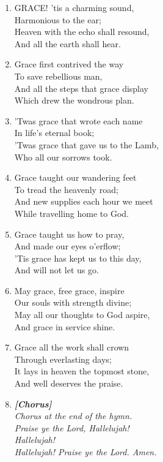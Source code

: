 \documentclass[11pt,a4paper]{article}
\begin{document}
\begin{enumerate}
    \item GRACE! 'tis a charming sound, \\
        Harmonious to the ear; \\
        Heaven with the echo shall resound, \\
        And all the earth shall hear.

    \item Grace first contrived the way \\
        To save rebellious man, \\
        And all the steps that grace display \\
        Which drew the wondrous plan.

    \item 'Twas grace that wrote each name \\
        In life's eternal book; \\
        'Twas grace that gave us to the Lamb, \\
        Who all our sorrows took.

    \item Grace taught our wandering feet \\
        To tread the heavenly road; \\
        And new supplies each hour we meet \\
        While travelling home to God.

    \item Grace taught us how to pray, \\
        And made our eyes o'erflow; \\
        'Tis grace has kept us to this day, \\
        And will not let us go.

    \item May grace, free grace, inspire \\
        Our souls with strength divine; \\
        May all our thoughts to God aspire, \\
        And grace in service shine.

    \item Grace all the work shall crown \\
        Through everlasting days; \\
        It lays in heaven the topmost stone, \\
        And well deserves the praise.

    \item[] \vspace{0.4em}
    \textbf{\textit{[Chorus]}} \\
    \textit{Chorus at the end of the hymn.} \\
    \textit{Praise ye the Lord, Hallelujah!} \\
    \textit{Hallelujah!} \\
    \textit{Hallelujah! Praise ye the Lord. Amen.}
    \vspace{0.4em}

\end{enumerate}
\end{document}
